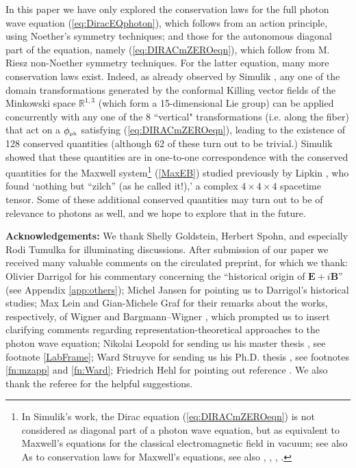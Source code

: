 \documentclass[11pt]{article}
\theoremstyle{definition}
\newcommand{\refeq}[1]{(\ref{#1})}
\numberwithin{equation}{section}
\newcommand{\bB}{\mathbf{B}}
\newcommand{\bE}{\mathbf{E}}
\newcommand{\phiPH}{{\phi_{\mbox{\rm\tiny ph}}}}
\newcommand{\Rset}{{\mathbb R}}
\begin{document}
 In this paper we have only explored the conservation laws for the full photon wave equation \refeq{eq:DiracEQphoton}, which
  follows from an action principle, using Noether's symmetry techniques; and those for the autonomous diagonal part of the 
equation, namely \refeq{eq:DIRACmZEROeqn}, which follow from M. Riesz non-Noether symmetry techniques. 
For the latter equation, many more conservation laws exist.
  Indeed, as already observed by Simulik \cite{Simulik}, any one of the domain transformations generated by the conformal 
Killing vector fields of the Minkowski space $\Rset^{1,3}$ (which form a 15-dimensional Lie group) can be applied concurrently 
with any one of the 8 ``vertical" transformations 
(i.e. along the fiber) that act on a $\phiPH$ satisfying \refeq{eq:DIRACmZEROeqn},
leading to the existence of 128 conserved quantities (although 62 of these turn out to be trivial.)
 Simulik showed that these quantities are in one-to-one correspondence with the conserved quantities for the Maxwell 
system\footnote{In Simulik's work, the 
 Dirac equation \refeq{eq:DIRACmZEROeqn} is not considered as diagonal part of a photon wave equation, but as equivalent to
Maxwell's equations for the classical electromagnetic field in vacuum; see also \cite{Moses1957,Moses1959}
 As to conservation laws for Maxwell's equations, see also \cite{BesselHagen}, \cite{Fushchych}, \cite{AncoPohj}, \cite{AncoThe}.\vspace{-10pt}}
 \refeq{MaxEB} studied previously by Lipkin \cite{Lipkin}, who found `nothing but ``zilch'' (as he called it!),' a complex
$4\times4\times4$ spacetime tensor.
 Some of these additional conserved quantities may turn out to be of relevance to photons as well, and we hope to explore that in the future. 
\bigskip

\noindent
{\bf Acknowledgements:} We thank Shelly Goldstein, Herbert Spohn, and especially Rodi Tumulka for illuminating discussions.  
  After submission of our paper we received many valuable comments on the circulated preprint, for which we thank:
 Olivier Darrigol for his commentary concerning the ``historical origin of $\bE+i\bB$'' (see Appendix \ref{app:others});
 Michel Jansen for pointing us to Darrigol's historical studies; 
 Max Lein and Gian-Michele Graf for their remarks about the works, respectively, of Wigner \cite{Wig1939} and Bargmann--Wigner 
\cite{BarWig1948}, which prompted us to insert clarifying comments regarding representation-theoretical approaches to the photon 
wave equation; Nikolai Leopold for sending us his master thesis \cite{Leopold}, see footnote \ref{LabFrame};
 Ward Struyve for sending us his Ph.D. thesis \cite{StruyvePHD}, see footnotes \ref{fn:mzapp} and \ref{fn:Ward}; 
 Friedrich Hehl for pointing out reference \cite{Cor1953}. 
 We also thank the referee for the helpful suggestions. 
\newpage
\end{document}
